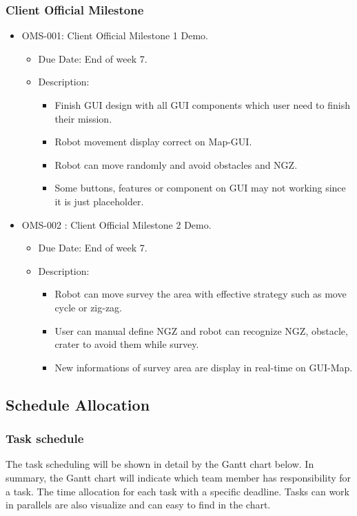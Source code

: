 \documentclass[11pt, a4paper]{article}
\begin{document}
		\subsubsection{Client Official Milestone}
			\begin{itemize}
				\item OMS-001: Client Official Milestone 1 Demo.
				\begin{itemize}
					\item Due Date: End of week 7.
					\item Description:
					\begin{itemize}
						\item Finish GUI design with all GUI components which user need to finish their mission.
						\item Robot movement display correct on Map-GUI.
						\item Robot can move randomly and avoid obstacles and NGZ.
						\item Some buttons, features or component on GUI may not working since it is just placeholder. 
					\end{itemize}
				\end{itemize}
				\item OMS-002 : Client Official Milestone 2 Demo.
				\begin{itemize}
					\item Due Date: End of week 7.
					\item Description:
					\begin{itemize}
						\item Robot can move survey the area with effective strategy such as move cycle or zig-zag.
						\item User can manual define NGZ and robot can recognize NGZ, obstacle, crater to avoid them while survey.
						\item New informations of survey area are display in real-time on GUI-Map.
					\end{itemize}
				\end{itemize}
			\end{itemize}
	\subsection{Schedule Allocation}
	\subsubsection{Task schedule}
	The task scheduling will be shown in detail by the Gantt chart below. In summary, the Gantt chart will indicate which team member has responsibility for a task. The time allocation for each task with a specific  deadline. Tasks can work in parallels are also visualize and can easy to find in the chart.     
\end{document}
